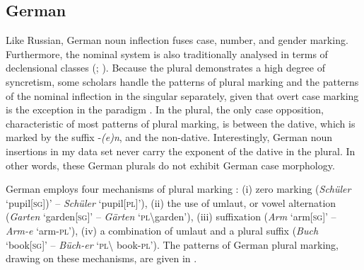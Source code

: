 \subsection{German}\label{german}

Like Russian, German noun inflection fuses case, number, and gender marking. Furthermore, the nominal system is also traditionally analysed in terms of declensional classes (\citealt[158]{eisenberg06}; ). Because the plural demonstrates a high degree of syncretism, some scholars handle the patterns of plural marking and the patterns of the nominal inflection in the singular separately, given that overt case marking is the exception in the paradigm \citep{flaemig, helbig-buscha,hentschel-weydt}. In the plural, the only case opposition, characteristic of most patterns of plural marking, is between the dative, which is marked by the suffix -\textit{(e)n}, and the non-dative. Interestingly, German noun insertions in my data set never carry the exponent of the dative in the plural. In other words, these German plurals do not exhibit German case morphology.

German employs four mechanisms of plural marking \citep[480]{flaemig}: (i) zero marking (\textit{Schüler} `pupil[\textsc{sg}])' -- \textit{Schüler} `pupil[\textsc{pl}]'), (ii) the use of umlaut, or vowel alternation (\textit{Garten} `garden[\textsc{sg}]' -- \textit{Gärten} `\textsc{pl}\textbackslash{}garden'), (iii) suffixation (\textit{Arm} `arm[\textsc{sg}]' -- \textit{Arm-e} `arm-\textsc{pl}'), (iv) a combination of umlaut and a plural suffix (\textit{Buch} `book[\textsc{sg}]' -- \textit{Büch-er} `\textsc{pl}\textbackslash{} book-\textsc{pl}'). The patterns of German plural marking, drawing on these mechanisms, are given in .

